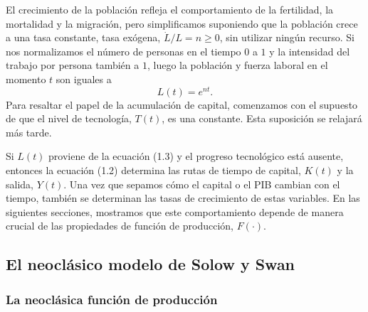 El crecimiento de la población refleja el comportamiento de la fertilidad, la mortalidad y la migración, pero simplificamos suponiendo que la población crece a una tasa constante, tasa exógena, $\dot{L}/L=n\geq0$, sin utilizar ningún recurso. Si nos normalizamos el número de personas en el tiempo $0$ a $1$ y la intensidad del trabajo por persona también a $1$, luego la población y fuerza laboral en el momento $t$ son iguales a
\begin{equation}
L\left(t\right)=e^{nt}.
\end{equation}
Para resaltar el papel de la acumulación de capital, comenzamos con el supuesto de que el nivel de tecnología, $T\left(t\right)$, es una constante. Esta suposición se relajará más tarde.

Si $L\left(t\right)$ proviene de la ecuación (1.3) y el progreso tecnológico está ausente, entonces la ecuación (1.2) determina las rutas de tiempo de capital, $K\left(t\right)$ y la salida, $Y\left(t\right)$. Una vez que sepamos cómo el capital o el PIB cambian con el tiempo, también se determinan las tasas de crecimiento de estas variables. En las siguientes secciones, mostramos que este comportamiento depende de manera crucial de las propiedades de función de producción, $F\left(\cdot\right)$.

\subsection{El neoclásico modelo de Solow y Swan}

\subsubsection{La neoclásica función de producción}

